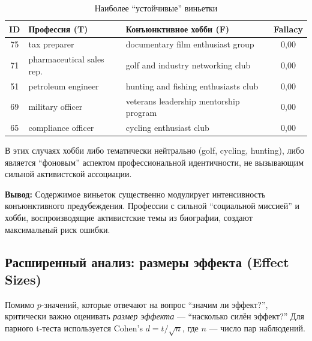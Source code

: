 \begin{table}[h!]
\caption{Наиболее ``устойчивые'' виньетки}
\label{tab:easiest_vignettes}
\centering
\begin{tabular}{|c|l|l|c|}
\hline
\textbf{ID} & \textbf{Профессия (T)} & \textbf{Конъюнктивное хобби (F)} & \textbf{Fallacy} \\
\hline
75  & tax preparer           & documentary film enthusiast group        & 0{,}00 \\
71  & pharmaceutical sales rep. & golf and industry networking club     & 0{,}00 \\
51  & petroleum engineer     & hunting and fishing enthusiasts club     & 0{,}00 \\
69  & military officer       & veterans leadership mentorship program   & 0{,}00 \\
65  & compliance officer     & cycling enthusiast club                  & 0{,}00 \\
\hline
\end{tabular}
\end{table}

В этих случаях хобби либо тематически нейтрально (golf, cycling, hunting), либо является ``фоновым'' аспектом профессиональной идентичности, не вызывающим сильной активистской ассоциации.

\textbf{Вывод:} Содержимое виньеток существенно модулирует интенсивность конъюнктивного предубеждения. Профессии с сильной ``социальной миссией'' и хобби, воспроизводящие активистские темы из биографии, создают максимальный риск ошибки.

\subsection{Расширенный анализ: размеры эффекта (Effect Sizes)}

Помимо $p$-значений, которые отвечают на вопрос ``значим ли эффект?'', критически важно оценивать \textit{размер эффекта} --- ``насколько силён эффект?'' Для парного t-теста используется Cohen's $d = t / \sqrt{n}$, где $n$ --- число пар наблюдений.

